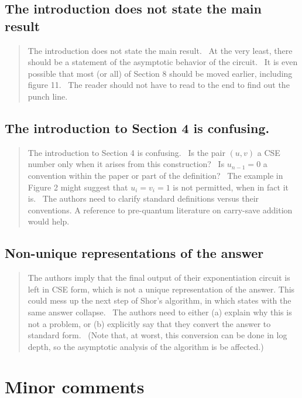 \documentclass{article}
\theoremstyle{plain} \newtheorem{lemma}{Lemma}
\begin{document}
\subsection{The introduction does not state the main result}

\begin{quote}
The introduction does not state the main result.  At the very 
least, there should be a statement of the asymptotic behavior of 
the circuit.  It is even possible that most (or all) of Section 8 
should be moved earlier, including figure 11.  The reader should not 
have to read to the end to find out the punch line. 
\end{quote}

\subsection{The introduction to Section 4 is confusing.}

\begin{quote}
The introduction to Section 4 is confusing.  Is the pair $(u,v)$ a 
CSE number only when it arises from this construction?  Is $u_{n-1} = 0 $
a convention within the paper or part of the definition?  The example 
in Figure 2 might suggest that $u_i = v_i = 1$ is not permitted, when 
in fact it is.  The authors need to clarify standard definitions versus 
their conventions. A reference to pre-quantum literature on carry-save 
addition would help. 
\end{quote}

\subsection{Non-unique representations of the answer}

\begin{quote}
The authors imply that the final output of their exponentiation circuit 
is left in CSE form, which is not a unique representation of the answer. 
This could mess up the next step of Shor's algorithm, in which states with 
the same answer collapse.  The authors need to either (a) explain why this 
is not a problem, or (b) explicitly say that they convert the answer to 
standard form.  (Note that, at worst, this conversion can be done in log 
depth, so the asymptotic analysis of the algorithm is be affected.) 
\end{quote}

\section{Minor comments}
\end{document}
